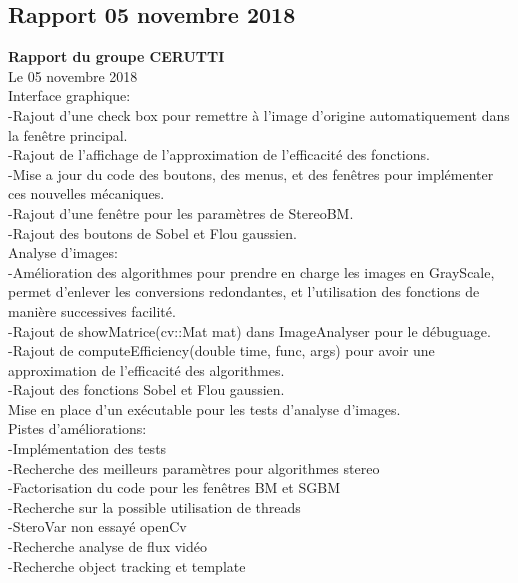 \documentclass{article}
\begin{document}
\subsection{Rapport 05 novembre 2018}

\textbf{Rapport du groupe CERUTTI}\\
Le 05 novembre 2018\\

Interface graphique:\\
	-Rajout d'une check box pour remettre à l'image d'origine automatiquement dans la fenêtre principal.\\
	-Rajout de l'affichage de l'approximation de l'efficacité des fonctions.\\
	-Mise a jour du code des boutons, des menus, et des fenêtres pour implémenter ces nouvelles mécaniques.\\
	-Rajout d'une fenêtre pour les paramètres de StereoBM.\\
	-Rajout des boutons de Sobel et Flou gaussien.
\\
	
Analyse d'images:\\
	-Amélioration des algorithmes pour prendre en charge les images en GrayScale, permet d'enlever les conversions redondantes, et l'utilisation des fonctions de manière successives facilité.\\
	-Rajout de showMatrice(cv::Mat mat) dans ImageAnalyser pour le débuguage.\\
	-Rajout de computeEfficiency(double time, func, args) pour avoir une approximation de l'efficacité des algorithmes.\\
	-Rajout des fonctions Sobel et Flou gaussien.\\

Mise en place d'un exécutable pour les tests d'analyse d'images.\\

Pistes d'améliorations:\\
	-Implémentation des tests\\
	-Recherche des meilleurs paramètres pour algorithmes stereo\\
	-Factorisation du code pour les fenêtres BM et SGBM\\
	-Recherche sur la possible utilisation de threads\\
	-SteroVar non essayé openCv\\
	-Recherche analyse de flux vidéo\\
	-Recherche object tracking et template
\\
\end{document}
